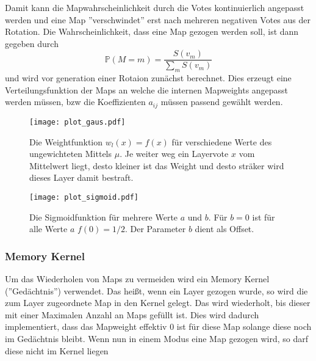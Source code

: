\begin{itemize}
                Damit kann die Mapwahrscheinlichkeit durch die Votes kontinuierlich angepasst werden und eine Map ''verschwindet'' erst nach mehreren negativen Votes aus der Rotation.
                Die Wahrscheinlichkeit, dass eine Map gezogen werden soll, ist dann gegeben durch 
                \begin{equation}
                    \mathbb{P}(M=m) = \frac{S(v_m)}{\sum_m S(v_m)}
                \end{equation}
                und wird vor generation einer Rotaion zunächst berechnet. 
                Dies erzeugt eine Verteilungsfunktion der Maps an welche die internen Mapweights angepasst werden müssen, bzw die Koeffizienten $a_{ij}$ müssen passend gewählt werden.
            \end{itemize}
            \begin{figure}[htbp]
                \centering 
                \texttt{[image: plot\_gaus.pdf]}
                \caption{Die Weightfunktion $w_l(x)=f(x)$ für verschiedene Werte des ungewichteten Mittels $\mu$. 
                        Je weiter weg ein Layervote $x$ vom Mittelwert liegt, desto kleiner ist das Weight und desto sträker wird dieses Layer damit bestraft. }
            \end{figure}
            \begin{figure}[htbp]
                \centering
                \texttt{[image: plot\_sigmoid.pdf]}
                \caption{Die Sigmoidfunktion für mehrere Werte $a$ und $b$. 
                            Für $b=0$ ist für alle Werte $a$ $f(0)=1/2$.
                            Der Parameter $b$ dient als Offset.}
            \end{figure}
        \subsubsection{Memory Kernel}
            Um das Wiederholen von Maps zu vermeiden wird ein Memory Kernel (''Gedächtnis'') verwendet. 
            Das heißt, wenn ein Layer gezogen wurde, so wird die zum Layer zugeordnete Map in den Kernel gelegt. 
            Das wird wiederholt, bis dieser mit einer Maximalen Anzahl an Maps gefüllt ist. 
            Dies wird dadurch implementiert, dass das Mapweight effektiv $0$ ist für diese Map solange diese noch im Gedächtnis bleibt.
            Wenn nun in einem Modus eine Map gezogen wird, so darf diese nicht im Kernel liegen
